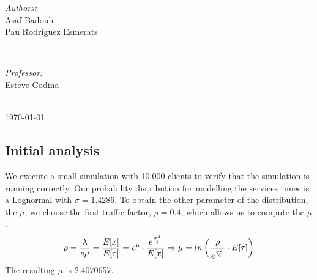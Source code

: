 \documentclass[]{article}
\begin{document}
\begin{titlepage}
\begin{center}
\begin{bottompar}
\begin{minipage}{0.5\textwidth}
\begin{flushleft} \large
\emph{Authors:}\\
Asaf Badouh \\ Pau Rodríguez Esmerats %
\end{flushleft}
\end{minipage}
~
\begin{minipage}{0.4\textwidth}
\begin{flushright} \large
\emph{Professor:} \\
Esteve Codina
\end{flushright}
\end{minipage}\\[2cm]


{\large \today}\\[2cm] %
\end{bottompar}
\end{center}
\end{titlepage}

\tableofcontents
\pagebreak


\subsection{Initial analysis}\label{initial-analysis}

We execute a small simulation with 10.000 clients to verify that the
simulation is running correctly. Our probability distribution for
modelling the services times is a Lognormal with \(\sigma=1.4286\). To
obtain the other parameter of the distribution, the \(\mu\), we choose
the first traffic factor, \(\rho=0.4\), which allows us to compute the
\(\mu\).\\
\[  \rho = { \lambda \over {s\mu}} = { E[x] \over E[\tau] } = e^{\mu} \cdot { e^{\sigma^{2} \over 2} \over E[x] } \Rightarrow \mu = ln \left( { \rho \over e^{ \sigma^{2} \over 2 } } \cdot E[\tau]  \right) \]
The resulting \(\mu\) is 2.4070657.
\end{document}
